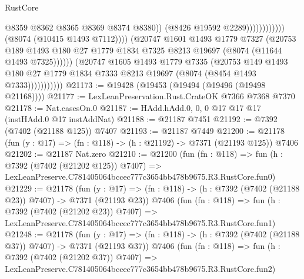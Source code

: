 \begin{lexlean}{RustCore}
\begin{coremodule}
                                                    @8359
                                                    @8362
                                                    @8365
                                                    @8369
                                                    @8374
                                                    @8380))
                                                (@8426 @19592 @2289))))))))))))
                          (@8074 (@10415 @1493 @7112))))
                      (@20747
                        @1601
                        @1493
                        @1779
                        @7327
                        (@20753
                          @189
                          @1493
                          @180
                          @27
                          @1779
                          @1834
                          @7325
                          @8213
                          @19697
                          (@8074 (@11644 @1493 @7325))))))
                  (@20747
                    @1605
                    @1493
                    @1779
                    @7335
                    (@20753
                      @149
                      @1493
                      @180
                      @27
                      @1779
                      @1834
                      @7333
                      @8213
                      @19697
                      (@8074 (@8454 @1493 @7333)))))))))))
@21173 := @19428 (@19453 (@19494 (@19496 (@19498 @21168))))
@21177 := LexLeanPreservation.Rust.CrateOK @7366 @7368 @7370
@21178 := Nat.casesOn.{0}
@21187 := HAdd.hAdd.{0, 0, 0} @17 @17 @17 (instHAdd.{0} @17 instAddNat)
@21188 := @21187 @7451
@21192 := @7392 (@7402 (@21188 @125)) @7407
@21193 := @21187 @7449
@21200 := @21178 (fun (y : @17) => (fn : @118) -> (h : @21192) -> @7371 (@21193 @125)) @7406
@21202 := @21187 Nat.zero
@21210 := @21200
    (fun (fn : @118) =>
    fun (h : @7392 (@7402 (@21202 @125)) @7407) =>
    LexLeanPreserve.C781405064bccec777c3654bb478b9675.R3.RustCore.fun0)
@21229 := @21178
    (fun (y : @17) => (fn : @118) -> (h : @7392 (@7402 (@21188 @23)) @7407) -> @7371 (@21193 @23))
    @7406
    (fun (fn : @118) =>
    fun (h : @7392 (@7402 (@21202 @23)) @7407) =>
    LexLeanPreserve.C781405064bccec777c3654bb478b9675.R3.RustCore.fun1)
@21248 := @21178
    (fun (y : @17) => (fn : @118) -> (h : @7392 (@7402 (@21188 @37)) @7407) -> @7371 (@21193 @37))
    @7406
    (fun (fn : @118) =>
    fun (h : @7392 (@7402 (@21202 @37)) @7407) =>
    LexLeanPreserve.C781405064bccec777c3654bb478b9675.R3.RustCore.fun2)

\end{coremodule}
\end{lexlean}
